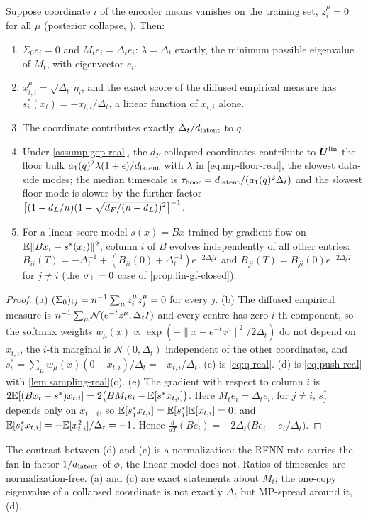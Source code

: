 \begin{lemma}\label{lem:dead-real}
Suppose coordinate $i$ of the encoder means vanishes on the training set, $z^\mu_i=0$ for all $\mu$ (posterior collapse, \citealp{lucas2019dontblame}). Then:
\begin{enumerate}
\item[(a)] $\Sigma_0e_i=0$ and $M_te_i=\Delta_te_i$: $\lambda=\Delta_t$ exactly, the minimum possible eigenvalue of $M_t$, with eigenvector $e_i$.
\item[(b)] $x^\mu_{t,i}=\sqrt{\Delta_t}\,\eta_i$, and the exact score of the diffused empirical measure \citep{scarvelis2023closedform,gu2023memorization,biroli2024dynamical} has $s^\ast_i(x_t)=-x_{t,i}/\Delta_t$, a linear function of $x_{t,i}$ alone.
\item[(c)] The coordinate contributes exactly $\Delta_t/d_{\mathrm{latent}}$ to $q$.
\item[(d)] Under \cref{assump:gep-real}, the $d_F$ collapsed coordinates contribute to $\bm{U}^{\mathrm{lin}}$ the floor bulk $a_1(q)^2\lambda(1+\epsilon)/d_{\mathrm{latent}}$ with $\lambda$ in \eqref{eq:mp-floor-real}, the slowest data-side modes; the median timescale is $\tau_{\mathrm{floor}}=d_{\mathrm{latent}}/(a_1(q)^2\Delta_t)$ and the slowest floor mode is slower by the further factor $\big[(1-d_L/n)(1-\sqrt{d_F/(n-d_L)})^2\big]^{-1}$.
\item[(e)] For a linear score model $s(x)=Bx$ trained by gradient flow on $\mathbb{E}\|Bx_t-s^\ast(x_t)\|^2$, column $i$ of $B$ evolves independently of all other entries: $B_{ii}(T)=-\Delta_t^{-1}+(B_{ii}(0)+\Delta_t^{-1})e^{-2\Delta_tT}$ and $B_{ji}(T)=B_{ji}(0)e^{-2\Delta_tT}$ for $j\ne i$ (the $\sigma_{\perp}=0$ case of \cref{prop:lin-gf-closed}).
\end{enumerate}
\end{lemma}
\begin{proof}
(a) $(\Sigma_0)_{ij}=n^{-1}\sum_\mu z^\mu_iz^\mu_j=0$ for every $j$. (b) The diffused empirical measure is $n^{-1}\sum_\mu\mathcal N(e^{-t}z^\mu,\Delta_tI)$ and every centre has zero $i$-th component, so the softmax weights $w_\mu(x)\propto\exp(-\|x-e^{-t}z^\mu\|^2/2\Delta_t)$ do not depend on $x_{t,i}$, the $i$-th marginal is $\mathcal N(0,\Delta_t)$ independent of the other coordinates, and $s^\ast_i=\sum_\mu w_\mu(x)(0-x_{t,i})/\Delta_t=-x_{t,i}/\Delta_t$. (c) is \eqref{eq:q-real}. (d) is \eqref{eq:push-real} with \cref{lem:sampling-real}(c). (e) The gradient with respect to column $i$ is $2\mathbb{E}[(Bx_t-s^\ast)x_{t,i}]=2\big(BM_te_i-\mathbb{E}[s^\ast x_{t,i}]\big)$. Here $M_te_i=\Delta_te_i$; for $j\ne i$, $s^\ast_j$ depends only on $x_{t,-i}$, so $\mathbb{E}[s^\ast_jx_{t,i}]=\mathbb{E}[s^\ast_j]\mathbb{E}[x_{t,i}]=0$; and $\mathbb{E}[s^\ast_ix_{t,i}]=-\mathbb{E}[x_{t,i}^2]/\Delta_t=-1$. Hence $\frac{d}{dT}(Be_i)=-2\Delta_t\big(Be_i+e_i/\Delta_t\big)$.
\end{proof}
The contrast between (d) and (e) is a normalization: the RFNN rate carries the fan-in factor $1/d_{\mathrm{latent}}$ of $\phi$, the linear model does not. Ratios of timescales are normalization-free. (a) and (c) are exact statements about $M_t$; the one-copy eigenvalue of a collapsed coordinate is not exactly $\Delta_t$ but MP-spread around it, (d).

